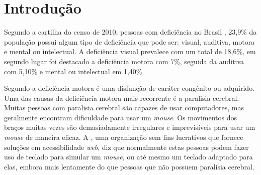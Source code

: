 \documentclass[
	12pt,			%
	openright,		%
	oneside,			%
	a4paper,			%
	chapter=TITLE,		%
	english,			%
	brazil,			%
	]{abntex2}
\begin{document}
\listoffigures*
\cleardoublepage

\listoftables*
\cleardoublepage



\tableofcontents*
\cleardoublepage



\textual

\chapter[Introdução]{Introdução}

Segundo a cartilha do censo de 2010, pessoas com deficiência no Brasil  , 23,9\% da população possui algum tipo de deficiência que pode ser: visual, auditiva, motora e mental ou intelectual. A deficiência visual prevalece com um total de 18,6\%, em segundo lugar foi destacado a deficiência motora com 7\%, seguida da auditiva com 5,10\% e mental ou intelectual em 1,40\%.

Segundo  a deficiência motora é uma disfunção de caráter congênito ou adquirido. Uma das causas da deficiência motora mais recorrente é a paralisia cerebral. Muitas pessoas com paralisia cerebral são capazes de usar computadores, mas geralmente encontram dificuldade para usar um \emph{mouse}. Os movimentos dos braços muitas vezes são demasiadamente irregulares e imprevisíveis para usar um \emph{mouse} de maneira eficaz. A , uma organização sem fins lucrativos que fornece soluções em acessibilidade \emph{web}, diz que normalmente estas pessoas podem fazer uso de teclado para simular um \emph{mouse}, ou até mesmo um teclado adaptado para elas, embora mais lentamente do que pessoas que não possuem paralisia cerebral.
\end{document}
